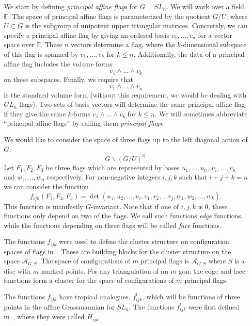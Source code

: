 \documentclass[ALCO,ThmDefs,Unicode,epreuves]{cedram}
\newcommand{\F}{\mathbb{F}}
\newcommand{\A}{\mathcal{A}}
\begin{document}
We start by defining \emph{principal affine flags} for $G=SL_n$. We will work over a field $\F$. The space of principal affine flags is parameterized by the quotient $G/U$, where $U \subset G$ is the subgroup of unipotent upper triangular matrices. Concretely, we can specify a principal affine flag by giving an ordered basis $v_1, \dots, v_n$ for a vector space over $\F$. These $n$ vectors determine a flag, where the $k$-dimensional subspace of this flag is spanned by $v_1, \dots , v_k$ for $k \leq n$. Additionally, the data of a principal affine flag includes the volume forms 
\[
 v_1 \wedge \dots \wedge v_k
\]
 on these subspaces. Finally, we require that 
\[
v_1 \wedge \dots \wedge v_n
\]
 is the standard volume form (without this requirement, we would be dealing with $GL_n$ flags). Two sets of basis vectors will determine the same principal affine flag if they give the same $k$-forms $v_1 \wedge \dots \wedge v_k$ for $k \leq n$. We will sometimes abbreviate ``principal affine flags'' by calling them \emph{principal flags}.

We would like to consider the space of three flags up to the left diagonal action of $G$:
\[
G \backslash (G/U)^3.
\]
Let $F_1, F_2, F_3$ be three flags which are represented by bases $u_1, \dots, u_n$, $v_1, \dots, v_n$ and $w_1, \dots, w_n$ respectively. For non-negative integers $i, j, k$ such that $i+j+k=n$ we can consider the function 
\[
f_{ijk}(F_1, F_2, F_3)=\det(u_1, u_2, \dots, u_i, v_1, v_2, \dots v_j, w_1, w_2, \dots, w_k).
\] 
This function is manifestly $G$-invariant. Note that if one of $i, j, k$ is $0$, these functions only depend on two of the flags. We call such functions {\em edge} functions, while the functions depending on three flags will be called {\em face} functions. 

\begin{rema} The functions $f_{ijk}$ were used to define the cluster structure on configuration spaces of flags in~\cite{FG1}. These are building blocks for the cluster structure on the space $\A_{G,S}$. The space of configurations of $m$ principal flags is $\A_{G,S}$ where $S$ is a disc with $m$ marked points. For any triangulation of an $m$-gon, the edge and face functions form a cluster for the space of configurations of $m$ principal flags.
\end{rema}

The functions $f_{ijk}$ have tropical analogues, $f_{ijk}^t$, which will be functions of three points in the affine Grassmannian for $SL_n$. The functions $f_{ijk}^t$ were first defined in~\cite{K}, where they were called $H_{ijk}$.
\end{document}
